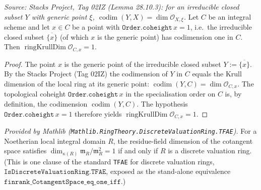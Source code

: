 \begin{lemma}

  \label{lem:coheight_eq_ringKrullDim_stalk}
  \textit{Source: Stacks Project, Tag 02IZ (Lemma 28.10.3): for an
  irreducible closed subset \(Y\) with generic point \(\xi\),
  \(\operatorname{codim}(Y, X) = \dim \mathcal O_{X, \xi}\).}
  Let \(C\) be an integral scheme and let \(x \in C\) be a point with
  \(\texttt{Order.coheight}\,x = 1\), i.e.\ the irreducible closed subset
  \(\overline{\{x\}}\) (of which \(x\) is the generic point) has
  codimension one in \(C\). Then \(\operatorname{ringKrullDim}
  \mathcal O_{C, x} = 1\).
\end{lemma}

\begin{proof}

\leanok
  The point \(x\) is the generic point of the irreducible closed subset
  \(Y := \overline{\{x\}}\). By the Stacks Project (Tag 02IZ) the
  codimension of \(Y\) in \(C\) equals the Krull dimension of the local ring
  at its generic point:
  \(\operatorname{codim}(Y, C) = \dim \mathcal O_{C, x}\). The topological
  coheight \(\texttt{Order.coheight}\,x\) in the specialisation order on
  \(C\) is, by definition, the codimension \(\operatorname{codim}(Y, C)\).
  The hypothesis \(\texttt{Order.coheight}\,x = 1\) therefore yields
  \(\operatorname{ringKrullDim} \mathcal O_{C, x} = 1\).
\end{proof}

\begin{lemma}
  \label{lem:finrank_cotangentSpace_eq_one_iff_isDVR}
  \mathlibok
  \textit{Provided by Mathlib
  (\texttt{Mathlib.RingTheory.DiscreteValuationRing.TFAE}).}
  For a Noetherian local integral domain \(R\), the residue-field dimension
  of the cotangent space satisfies
  \(\dim_{\kappa(R)} \mathfrak m_R / \mathfrak m_R^2 = 1\) if and only if
  \(R\) is a discrete valuation ring. (This is one clause of the standard
  \texttt{TFAE} for discrete valuation rings,
  \(\texttt{IsDiscreteValuationRing.TFAE}\), exposed as the stand-alone
  equivalence \(\texttt{finrank\_CotangentSpace\_eq\_one\_iff}\).)
\end{lemma}

